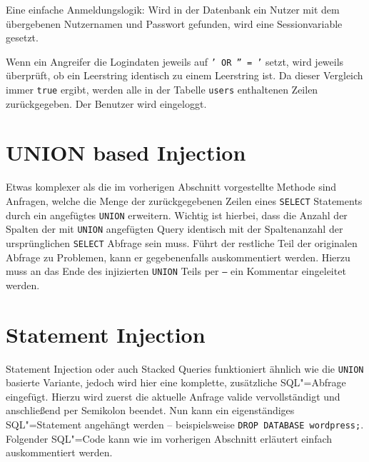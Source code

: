 \begin{listing}
\begin{margincap}
\inputminted[startinline,obeytabs]{php}{imports/login_1.php}
\caption{Eine einfache Anmeldungslogik: Wird in der Datenbank ein Nutzer mit dem übergebenen Nutzernamen und Passwort gefunden, wird eine Sessionvariable gesetzt. }
\label{lst:login_query}
\end{margincap}
\end{listing}

Wenn ein Angreifer die Logindaten jeweils auf \texttt{' OR '' = '} setzt, wird jeweils überprüft, ob ein Leerstring identisch zu einem Leerstring ist. Da dieser Vergleich immer \texttt{true} ergibt, werden alle in der Tabelle \texttt{users} enthaltenen Zeilen zurückgegeben. Der Benutzer wird eingeloggt.

\section{UNION based Injection}

Etwas komplexer als die im vorherigen Abschnitt vorgestellte Methode sind Anfragen, welche die Menge der zurückgegebenen Zeilen eines \texttt{SELECT} Statements durch ein angefügtes \texttt{UNION} erweitern. Wichtig ist hierbei, dass die Anzahl der Spalten der mit \texttt{UNION} angefügten Query identisch mit der Spaltenanzahl der ursprünglichen  \texttt{SELECT} Abfrage sein muss. Führt der restliche Teil der originalen Abfrage zu Problemen, kann er gegebenenfalls auskommentiert werden. Hierzu muss an das Ende des injizierten \texttt{UNION} Teils per \texttt{--} ein Kommentar eingeleitet werden.


\section{Statement Injection}

{Statement Injection } oder auch Stacked Queries funktioniert ähnlich wie die \texttt{UNION} basierte Variante, jedoch wird hier eine komplette, zusätzliche SQL"=Abfrage eingefügt. Hierzu wird zuerst die aktuelle Anfrage valide vervollständigt und anschließend per Semikolon beendet. Nun kann ein eigenständiges SQL"=Statement angehängt werden -- beispielsweise \texttt{DROP DATABASE wordpress;}. Folgender SQL"=Code kann wie im vorherigen Abschnitt erläutert einfach auskommentiert werden.



